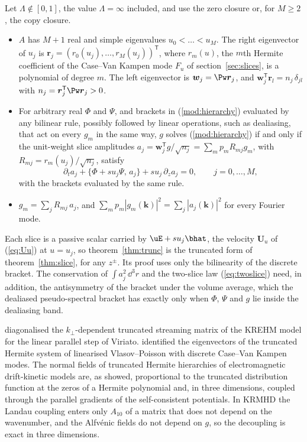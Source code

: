 \begin{theorem}\label{thm:trunc}
Let $\Lambda\notin[0,1]$, the value $\Lambda=\infty$ included, and use the zero closure or, for $M\ge2$, the copy closure.
\begin{itemize}
\item[(i)] $A$ has $M+1$ real and simple eigenvalues $u_0<\dots<u_M$. The right eigenvector of $u_j$ is $\boldsymbol r_j=(r_0(u_j),\dots,r_M(u_j))^{\mathsf T}$, where $r_m(u)$, the $m$th Hermite coefficient of the Case--Van Kampen mode $F_u$ of section~\ref{sec:slices}, is a polynomial of degree $m$. The left eigenvector is $\boldsymbol w_j=\Pw\boldsymbol r_j$, and $\boldsymbol w_j^{\mathsf T}\boldsymbol r_l=n_j\,\delta_{jl}$ with $n_j=\boldsymbol r_j^{\mathsf T}\Pw\boldsymbol r_j>0$.
\item[(ii)] For arbitrary real $\Phi$ and $\Psi$, and brackets in (\ref{mod:hierarchy}) evaluated by any bilinear rule, possibly followed by linear operations, such as dealiasing, that act on every $g_m$ in the same way, $g$ solves (\ref{mod:hierarchy}) if and only if the unit-weight slice amplitudes $a_j=\boldsymbol w_j^{\mathsf T}g/\sqrt{n_j}=\sum_mp_mR_{mj}g_m$, with $R_{mj}=r_m(u_j)/\sqrt{n_j}$, satisfy
\begin{equation}\label{eq:truncslice}
  \partial_ta_j+\{\Phi+su_j\Psi,\,a_j\}+su_j\,\partial_za_j=0,\qquad j=0,\dots,M,
\end{equation}
with the brackets evaluated by the same rule.
\item[(iii)] $g_m=\sum_jR_{mj}\,a_j$, and $\sum_mp_m|g_m(\boldsymbol k)|^2=\sum_j|a_j(\boldsymbol k)|^2$ for every Fourier mode.
\end{itemize}
\end{theorem}

Each slice is a passive scalar carried by $\uE+su_j\bhat$, the velocity $\boldsymbol U_u$ of (\ref{eq:Uu}) at $u=u_j$, so theorem~\ref{thm:trunc} is the truncated form of theorem~\ref{thm:slice}, for any $z^\pm$. Its proof uses only the bilinearity of the discrete bracket. The conservation of $\int a_j^2\,\dd^3r$ and the two-slice law (\ref{eq:twoslice}) need, in addition, the antisymmetry of the bracket under the volume average, which the dealiased pseudo-spectral bracket has exactly only when $\Phi$, $\Psi$ and $g$ lie inside the dealiasing band.

\citet[\S6.2.1]{Loureiro2016} diagonalised the $k_\perp$-dependent truncated streaming matrix of the KREHM model for the linear parallel step of Viriato. \citet{ParkerDellar2015} identified the eigenvectors of the truncated Hermite system of linearised Vlasov--Poisson with discrete Case--Van Kampen modes. The normal fields of truncated Hermite hierarchies of electromagnetic drift-kinetic models \citep{Tassi2015} are, as \citet[\S7]{Tassi2022} showed, proportional to the truncated distribution function at the zeros of a Hermite polynomial and, in three dimensions, coupled through the parallel gradients of the self-consistent potentials. In KRMHD the Landau coupling enters only $A_{10}$ of a matrix that does not depend on the wavenumber, and the Alfv\'enic fields do not depend on $g$, so the decoupling is exact in three dimensions.

